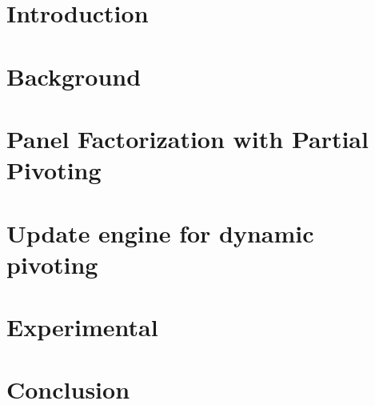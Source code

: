 \maketitle
\newpage
\null
\newpage

\abstract{
  
}

\tableofcontents
\newpage


\chapter{Introduction}\label{intro}%


\chapter{Background}\label{background}


\chapter{Panel Factorization with Partial Pivoting}\label{panel}


\chapter{Update engine for dynamic pivoting}\label{update}


\chapter{Experimental}\label{experimental}


\chapter*{Conclusion}\label{conclusion}







